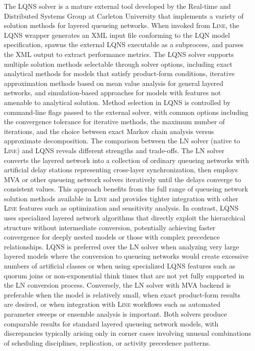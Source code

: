 The LQNS solver is a mature external tool developed by the Real-time and Distributed Systems Group at Carleton University that implements a variety of solution methods for layered queueing networks. When invoked from \textsc{Line}, the LQNS wrapper generates an XML input file conforming to the LQN model specification, spawns the external LQNS executable as a subprocess, and parses the XML output to extract performance metrics. The LQNS solver supports multiple solution methods selectable through solver options, including exact analytical methods for models that satisfy product-form conditions, iterative approximation methods based on mean value analysis for general layered networks, and simulation-based approaches for models with features not amenable to analytical solution. Method selection in LQNS is controlled by command-line flags passed to the external solver, with common options including the convergence tolerance for iterative methods, the maximum number of iterations, and the choice between exact Markov chain analysis versus approximate decomposition. The comparison between the LN solver (native to \textsc{Line}) and LQNS reveals different strengths and trade-offs. The LN solver converts the layered network into a collection of ordinary queueing networks with artificial delay stations representing cross-layer synchronization, then employs MVA or other queueing network solvers iteratively until the delays converge to consistent values. This approach benefits from the full range of queueing network solution methods available in \textsc{Line} and provides tighter integration with other \textsc{Line} features such as optimization and sensitivity analysis. In contrast, LQNS uses specialized layered network algorithms that directly exploit the hierarchical structure without intermediate conversion, potentially achieving faster convergence for deeply nested models or those with complex precedence relationships. LQNS is preferred over the LN solver when analyzing very large layered models where the conversion to queueing networks would create excessive numbers of artificial classes or when using specialized LQNS features such as quorum joins or non-exponential think times that are not yet fully supported in the LN conversion process. Conversely, the LN solver with MVA backend is preferable when the model is relatively small, when exact product-form results are desired, or when integration with \textsc{Line} workflows such as automated parameter sweeps or ensemble analysis is important. Both solvers produce comparable results for standard layered queueing network models, with discrepancies typically arising only in corner cases involving unusual combinations of scheduling disciplines, replication, or activity precedence patterns.

